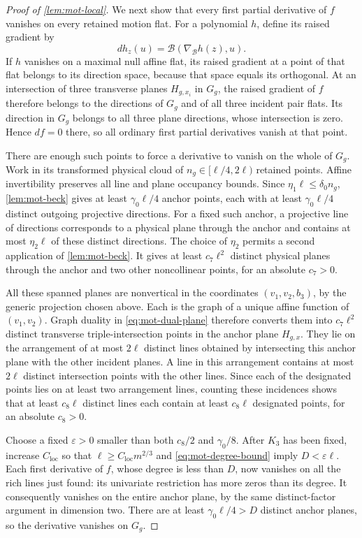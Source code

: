 \begin{proof}[Proof of \cref{lem:mot-local}]
We next show that every first partial derivative of $f$ vanishes on every retained motion flat.  For a polynomial $h$, define its raised gradient by
\[
 dh_z(u)=\mathcal{B}(\nabla_{\mathcal{B}}h(z),u).
\]
If $h$ vanishes on a maximal null affine flat, its raised gradient at a point of that flat belongs to its direction space, because that space equals its orthogonal.  At an intersection of three transverse planes $H_{g,x_i}$ in $G_g$, the raised gradient of $f$ therefore belongs to the directions of $G_g$ and of all three incident pair flats.  Its direction in $G_g$ belongs to all three plane directions, whose intersection is zero.  Hence $df=0$ there, so all ordinary first partial derivatives vanish at that point.

There are enough such points to force a derivative to vanish on the whole of $G_g$.  Work in its transformed physical cloud of $n_g\in[\ell/4,2\ell)$ retained points.  Affine invertibility preserves all line and plane occupancy bounds.  Since $\eta_1\ell\le\delta_0 n_g$, \cref{lem:mot-beck} gives at least $\gamma_0\ell/4$ anchor points, each with at least $\gamma_0\ell/4$ distinct outgoing projective directions. For a fixed such anchor, a projective line of directions corresponds to a physical plane through the anchor and contains at most $\eta_2\ell$ of these distinct directions.  The choice of $\eta_2$ permits a second application of \cref{lem:mot-beck}. It gives at least $c_7\ell^2$ distinct physical planes through the anchor and two other noncollinear points, for an absolute $c_7>0$.

All these spanned planes are nonvertical in the coordinates $(v_1,v_2,b_3)$, by the generic projection chosen above.  Each is the graph of a unique affine function of $(v_1,v_2)$. Graph duality in \eqref{eq:mot-dual-plane} therefore converts them into $c_7\ell^2$ distinct transverse triple-intersection points in the anchor plane $H_{g,x}$.  They lie on the arrangement of at most $2\ell$ distinct lines obtained by intersecting this anchor plane with the other incident planes.  A line in this arrangement contains at most $2\ell$ distinct intersection points with the other lines.  Since each of the designated points lies on at least two arrangement lines, counting these incidences shows that at least $c_8\ell$ distinct lines each contain at least $c_8\ell$ designated points, for an absolute $c_8>0$.

Choose a fixed $\varepsilon>0$ smaller than both $c_8/2$ and $\gamma_0/8$.  After $K_3$ has been fixed, increase $C_{\mathrm{loc}}$ so that $\ell\ge C_{\mathrm{loc}}m^{2/3}$ and \eqref{eq:mot-degree-bound} imply $D<\varepsilon\ell$. Each first derivative of $f$, whose degree is less than $D$, now vanishes on all the rich lines just found: its univariate restriction has more zeros than its degree.  It consequently vanishes on the entire anchor plane, by the same distinct-factor argument in dimension two.  There are at least $\gamma_0\ell/4>D$ distinct anchor planes, so the derivative vanishes on $G_g$.


\end{proof}
